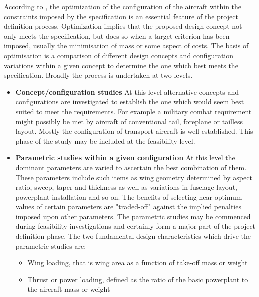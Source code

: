 According to \cite{howe2000aircraft}, the optimization of the configuration of the aircraft within the constraints imposed by the specification is an essential feature of the project definition process. Optimization implies that the proposed design concept not only meets the specification, but does so when a target criterion has been imposed, usually the minimisation of mass or some aspect of costs.
%
The basis of optimisation is a comparison of different design concepts and configuration variations within a given concept to determine the one which best meets the specification. Broadly the process is undertaken at two levels.
%
\begin{itemize}
\item \textbf{Concept/configuration studies} At this level alternative concepts and configurations are investigated to establish the one which would seem best suited to meet the requirements. For example a military combat requirement might possibly be met by aircraft of conventional tail, foreplane or tailless layout. Mostly the configuration of transport aircraft is well established. This phase of the study may be included at the feasibility level.
\item \textbf{Parametric studies within a given configuration} At this level the dominant parameters are varied to ascertain the best combination of them. These parameters include such items as wing geometry determined by aspect ratio, sweep, taper and thickness as well as variations in fuselage layout, powerplant installation and so on. The benefits of selecting near optimum values of certain parameters are "traded-off" against the implied penalties
imposed upon other parameters. The parametric studies may be commenced during feasibility investigations and certainly form a major part of the project definition phase. The two fundamental design characteristics which drive the parametric studies are:
\begin{itemize}
\item Wing loading, that is wing area as a function of take-off mass or weight
\item Thrust or power loading, defined as the ratio of the basic powerplant to the aircraft mass or weight
\end{itemize}
\end{itemize}
\noindent \\


